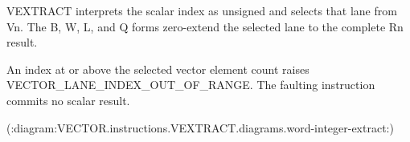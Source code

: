 VEXTRACT interprets the scalar index as unsigned and selects that lane from
Vn. The B, W, L, and Q forms zero-extend the selected lane to the complete Rn
result.

An index at or above the selected vector element count raises
VECTOR\_LANE\_INDEX\_OUT\_OF\_RANGE. The faulting instruction
commits no scalar result.

(:diagram:VECTOR.instructions.VEXTRACT.diagrams.word-integer-extract:)
